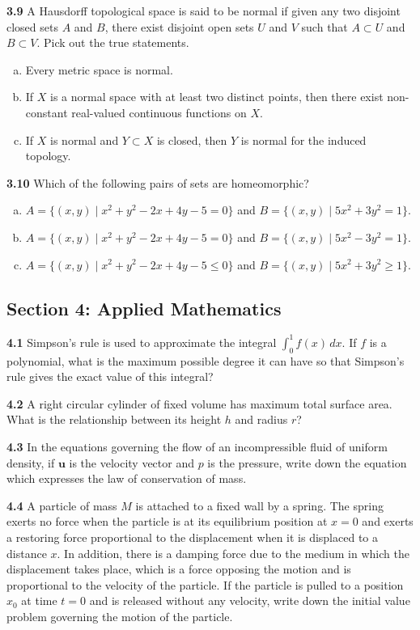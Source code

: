 \documentclass[11pt,a4paper]{article}
\newcommand{\examsec}[1]{%
  \subsection*{#1}
  \vspace{-2pt}
}
\newcommand{\qitem}[1]{\par\medskip\noindent\textbf{#1}\hspace{0.5em}}
\begin{document}
\qitem{3.9} A Hausdorff topological space is said to be normal if given any two disjoint closed sets $A$ and $B$, there exist disjoint open sets $U$ and $V$ such that $A \subset U$ and $B \subset V$. Pick out the true statements.
\begin{enumerate}[a.]
  \item Every metric space is normal.
  \item If $X$ is a normal space with at least two distinct points, then there exist non-constant real-valued continuous functions on $X$.
  \item If $X$ is normal and $Y \subset X$ is closed, then $Y$ is normal for the induced topology.
\end{enumerate}

\qitem{3.10} Which of the following pairs of sets are homeomorphic?
\begin{enumerate}[a.]
  \item $A = \{(x, y) \mid x^2 + y^2 - 2x + 4y - 5 = 0\}$ and $B = \{(x, y) \mid 5x^2 + 3y^2 = 1\}$.
  \item $A = \{(x, y) \mid x^2 + y^2 - 2x + 4y - 5 = 0\}$ and $B = \{(x, y) \mid 5x^2 - 3y^2 = 1\}$.
  \item $A = \{(x, y) \mid x^2 + y^2 - 2x + 4y - 5 \le 0\}$ and $B = \{(x, y) \mid 5x^2 + 3y^2 \ge 1\}$.
\end{enumerate}

\examsec{Section 4: Applied Mathematics}

\qitem{4.1} Simpson's rule is used to approximate the integral $\int_0^1 f(x)\,dx$. If $f$ is a polynomial, what is the maximum possible degree it can have so that Simpson's rule gives the exact value of this integral?

\qitem{4.2} A right circular cylinder of fixed volume has maximum total surface area. What is the relationship between its height $h$ and radius $r$?

\qitem{4.3} In the equations governing the flow of an incompressible fluid of uniform density, if $\mathbf{u}$ is the velocity vector and $p$ is the pressure, write down the equation which expresses the law of conservation of mass.

\qitem{4.4} A particle of mass $M$ is attached to a fixed wall by a spring. The spring exerts no force when the particle is at its equilibrium position at $x = 0$ and exerts a restoring force proportional to the displacement when it is displaced to a distance $x$. In addition, there is a damping force due to the medium in which the displacement takes place, which is a force opposing the motion and is proportional to the velocity of the particle. If the particle is pulled to a position $x_0$ at time $t = 0$ and is released without any velocity, write down the initial value problem governing the motion of the particle.
\end{document}
